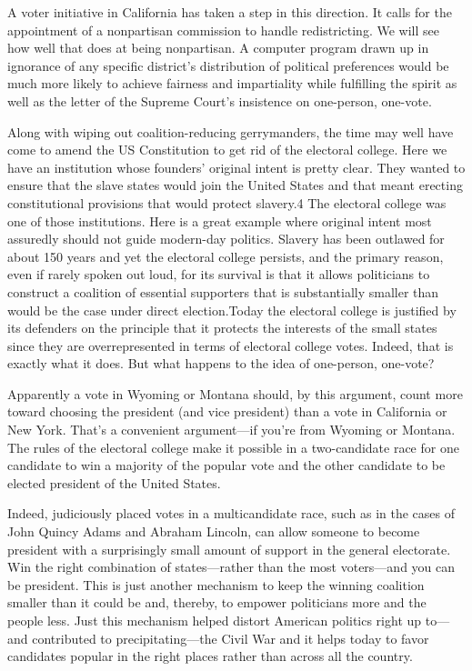 \documentclass[10pt]{article}
\begin{document}
{\large A voter initiative in California has taken a step in this direction. It
calls for the appointment of a nonpartisan commission to handle redistricting. We
will see how well that does at being nonpartisan. A computer program drawn up in
ignorance of any specific district's distribution of political preferences would
be much more likely to achieve fairness and impartiality while fulfilling the
spirit as well as the letter of the Supreme Court's insistence on one-person,
one-vote.}

{\large Along with wiping out coalition-reducing gerrymanders, the time may well
have come to amend the US Constitution to get rid of the electoral college. Here
we have an institution whose founders' original intent is pretty clear. They
wanted to ensure that the slave states would join the United States and that
meant erecting constitutional provisions that would protect slavery.4 The
electoral college was one of those institutions. Here is a great example where
original intent most assuredly should not guide modern-day politics. Slavery has
been outlawed for about 150 years and yet the electoral college persists, and the
primary reason, even if rarely spoken out loud, for its survival is that it
allows politicians to construct a coalition of essential supporters that is
substantially smaller than would be the case under direct election.Today the
electoral college is justified by its defenders on the principle that it protects
the interests of the small states since they are overrepresented in terms of
electoral college votes. Indeed, that is exactly what it does. But what happens
to the idea of one-person, one-vote?}

{\large Apparently a vote in Wyoming or Montana should, by this argument, count
more toward choosing the president (and vice president) than a vote in California
or New York. That's a convenient argument---if you're from Wyoming or Montana.
The rules of the electoral college make it possible in a two-candidate race for
one candidate to win a majority of the popular vote and the other candidate to be
elected president of the United States.}

{\large Indeed, judiciously placed votes in a multicandidate race, such as in
the cases of John Quincy Adams and Abraham Lincoln, can allow someone to become
president with a surprisingly small amount of support in the general electorate.
Win the right combination of states---rather than the most voters---and you can
be president. This is just another mechanism to keep the winning coalition
smaller than it could be and, thereby, to empower politicians more and the people
less. Just this mechanism helped distort American politics right up to---and
contributed to precipitating---the Civil War and it helps today to favor
candidates popular in the right places rather than across all the country.}
\end{document}
